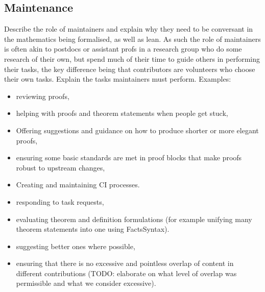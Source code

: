 \subsection{Maintenance}

Describe the role of maintainers and explain why they need to be conversant in the mathematics being formalised, as well as lean. As such the role of maintainers is often akin to postdocs or assistant profs in a research group who do some research of their own, but spend much of their time to guide others in performing their tasks, the key difference being that contributors are volunteers who choose their own tasks. Explain the tasks maintainers must perform. Examples:

\begin{itemize}
\item reviewing proofs,
\item helping with proofs and theorem statements when people get stuck,
\item Offering suggestions and guidance on how to produce shorter or more elegant proofs,
\item ensuring some basic standards are met in proof blocks that make proofs robust to upstream changes,
\item Creating and maintaining CI processes.
\item responding to task requests,
\item evaluating theorem and definition formulations (for example unifying many theorem statements into one using FactsSyntax).
\item suggesting better ones where possible,
\item ensuring that there is no excessive and pointless overlap of content in different contributions (TODO: elaborate on what level of overlap was permissible and what we consider excessive).
\end{itemize}
